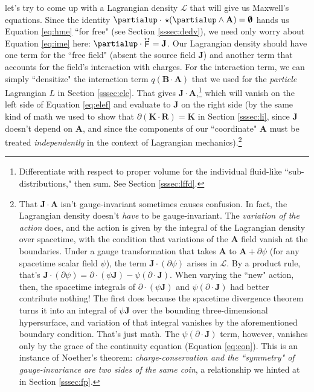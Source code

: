 \documentclass[12pt]{article}
\renewcommand{\vv}[1]{\mathbf{#1}}
\newcommand{\tightoverset}[2]{%
  \mathop{#2}\limits^{\vbox to -.5ex{\kern-0.75ex\hbox{$#1$}\vss}}}
\newcommand{\inlinedy}[1]{\tightoverset{\text{\tiny$\bm\leftrightarrow$}}{#1}}
\begin{document}
let's try to come up with a Lagrangian density $\mathcal{L}$ that will give us Maxwell's equations. Since the identity $\partialup \cdot \, \star ( \partialup \wedge \vv A ) = \textrm{\mbox{\boldmath $\emptyset$}}$ hands us Equation \ref{eq:hme} ``for free" (see Section \ref{sssec:dedv}), we need only worry about Equation \ref{eq:ime} here: $\partialup \cdot \inlinedy{\mathsf{F}} = \vv J$. Our Lagrangian density should have one term for the ``free field" (absent the source field $\vv J$) and another term that accounts for the field's interaction with charges. For the interaction term, we can simply ``densitize" the interaction term $q (\vv B \cdot \vv A)$ that we used for the \emph{particle} Lagrangian $L$ in Section \ref{sssec:ele}. That gives $\vv J \cdot \vv A$,\footnote{Differentiate with respect to proper volume for the individual fluid-like ``sub-distributions," then sum. See Section \ref{sssec:lffd}.} which will vanish on the left side of Equation \ref{eq:elef} and evaluate to $\vv J$ on the right side (by the same kind of math we used to show that $\partialup ( \vv K \cdot \vv R ) = \vv K$ in Section \ref{sssec:li}, since $\vv J$ doesn't depend on $\vv A$, and since the components of our ``coordinate" $\vv A$ must be treated \emph{independently} in the context of Lagrangian mechanics).\footnote{That $\vv J \cdot \vv A$ isn't gauge-invariant sometimes causes confusion. In fact, the Lagrangian density doesn't \emph{have} to be gauge-invariant. The \emph{variation of the action} does, and the action is given by the integral of the Lagrangian density over spacetime, with the condition that variations of the $\vv A$ field vanish at the boundaries. Under a gauge transformation that takes $\vv A$ to $\vv A + \partialup \psi$ (for any spacetime scalar field $\psi$), the term $\vv J \cdot ( \partialup \psi )$ arises in $\mathcal{L}$. By a product rule, that's $\vv J \cdot ( \partialup \psi ) = \partialup \cdot (\psi \vv J) - \psi  ( \partialup \cdot \vv J )$. When varying the ``new" action, then, the spacetime integrals of $\partialup \cdot (\psi \vv J)$ and $\psi ( \partialup \cdot \vv J )$ had better contribute nothing! The first does because the spacetime divergence theorem turns it into an integral of $\psi \vv J$ over the bounding three-dimensional hypersurface, and variation of that integral vanishes by the aforementioned boundary condition. That's just math. The $\psi ( \partialup \cdot \vv J )$ term, however, vanishes only by the grace of the continuity equation (Equation \ref{eq:con}). This is an instance of Noether's theorem: \emph{charge-conservation and the ``symmetry" of gauge-invariance are two sides of the same coin}, a relationship we hinted at in Section \ref{sssec:fp}.}
\end{document}
